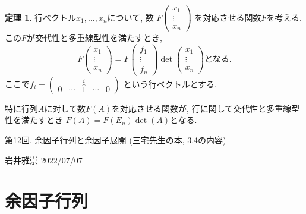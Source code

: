 \documentclass[dvipdfmx,a4paper,11pt]{article}
\theoremstyle{definition}
\newtheorem{thm}{定理}
\begin{document}
\begin{tcolorbox}[
    colback = white,
    colframe = green!35!black,
    fonttitle = \bfseries,
    breakable = true]
    \begin{thm}
行ベクトル$x_1, \ldots, x_n$について, 数
$F\begin{pmatrix}
x_1 \\ \vdots \\ x_{n}
\end{pmatrix}$
を対応させる関数$F$を考える.
この$F$が交代性と多重線型性を満たすとき, 
$$
F\begin{pmatrix}
x_1 \\ \vdots \\ x_{n}
\end{pmatrix}
=
F\begin{pmatrix}
f_1 \\ \vdots \\ f_{n}
\end{pmatrix}
\det
\begin{pmatrix}
x_1 \\ \vdots \\ x_{n}
\end{pmatrix}
\text{となる.}
$$
ここで$f_i =
\begin{pmatrix}
0 & \cdots&\overset{i}{\hat{1}}&\cdots &0
\end{pmatrix}
$
という行ベクトルとする.

特に行列$A$に対して数$F(A)$を対応させる関数が, 行に関して交代性と多重線型性を満たすとき
$F(A) =F(E_n) \det(A)$となる.
  \end{thm}
 \end{tcolorbox}
 
\newpage

\begin{center}
{\Large 第12回. 余因子行列と余因子展開 (三宅先生の本, 3.4の内容)} 
\end{center}

\begin{flushright}
 岩井雅崇 2022/07/07
\end{flushright}


\section{余因子行列}
\end{document}
